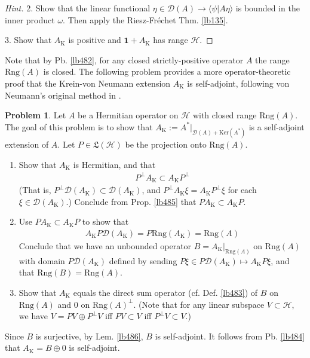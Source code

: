 \documentclass[12pt,b5paper,notitlepage]{article}
\theoremstyle{definition}
\newtheorem{prob}{\color{red}Problem}[section]
\theoremstyle{plain}
\newcommand{\fk}{\mathfrak}
\newcommand{\idt}{\mathbf{1}}
\newcommand{\Dom}{\mathscr{D}}
\newcommand{\bk}[1]{\langle {#1}\rangle}
\newcommand{\Ker}{\mathrm{Ker}}
\newcommand{\Rng}{\mathrm{Rng}}
\newcommand{\MH}{\mathcal H}
\newcommand{\Krm}{{\mathrm K}}
\numberwithin{equation}{section}
\begin{document}
\begin{proof}[Hint]
2.  Show that the linear functional $\eta\in\Dom(A)\rightarrow\bk{\psi|A\eta}$ is bounded in the inner product $\omega$. Then apply the Riesz-Fr\'echet Thm. \ref{lb135}.

3. Show that $A_\Krm$ is positive and $\idt+A_\Krm$ has range $\MH$.
\end{proof}



Note that by Pb. \ref{lb482}, for any closed strictly-positive operator $A$ the range $\Rng(A)$ is closed. The following problem provides a more operator-theoretic proof that the Krein-von Neumann extension $A_\Krm$ is self-adjoint, following von Neumann's original method in \cite{vN29a}.

\begin{prob}\label{lb533}
Let $A$ be a Hermitian operator on $\MH$ with closed range $\Rng(A)$. The goal of this problem is to show that $A_\Krm:=A^*|_{\Dom(A)+\Ker(A^*)}$ is a self-adjoint extension of $A$. Let $P\in\fk L(\MH)$ be the projection onto $\Rng(A)$.
\begin{enumerate}
\item  Show that $A_\Krm$ is Hermitian, and that
\begin{align*}
P^\perp A_\Krm\subset A_\Krm P^\perp
\end{align*}
(That is, $P^\perp\Dom(A_\Krm)\subset\Dom(A_\Krm)$, and $P^\perp A_\Krm\xi=A_\Krm P^\perp\xi$ for each $\xi\in\Dom(A_\Krm)$.) Conclude from Prop. \ref{lb485} that $PA_\Krm\subset A_\Krm P$.
\item Use $PA_\Krm\subset A_\Krm P$ to show that
\begin{align*}
A_\Krm P\Dom(A_\Krm)=P\Rng(A_\Krm)=\Rng(A)
\end{align*}
Conclude that we have an unbounded operator $B=A_\Krm|_{\Rng(A)}$ on $\Rng(A)$ with domain $P\Dom(A_\Krm)$ defined by sending $P\xi\in P\Dom(A_\Krm)\mapsto A_\Krm P\xi$, and that $\Rng(B)=\Rng(A)$. 
\item Show that $A_\Krm$ equals the direct sum operator (cf. Def. \ref{lb483}) of $B$ on $\Rng(A)$ and $0$ on $\Rng(A)^\perp$. (Note that for any linear subspace $V\subset \MH$, we have $V=PV\oplus P^\perp V$ iff $PV\subset V$ iff $P^\perp V\subset V$.) 
\end{enumerate}
Since $B$ is surjective, by Lem. \ref{lb486}, $B$ is self-adjoint. It follows from Pb. \ref{lb484} that $A_\Krm=B\oplus 0$ is self-adjoint.
\end{prob}
\end{document}
